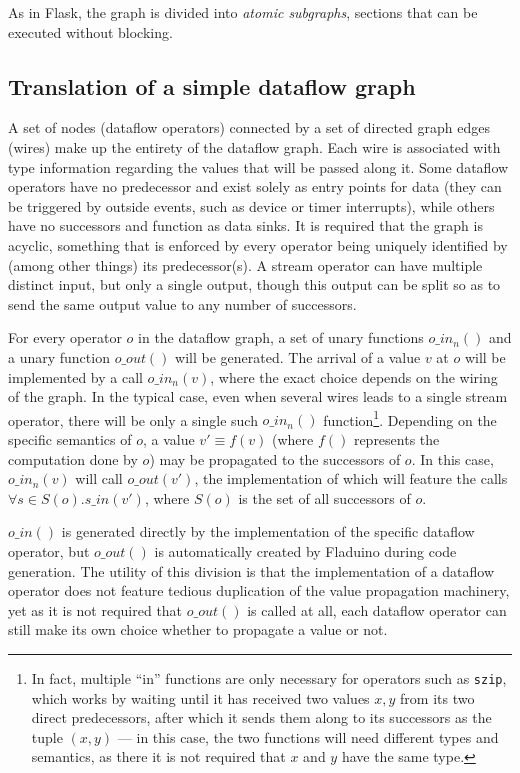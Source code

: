\documentclass[a4paper, oneside, final]{memoir}
\begin{document}
As in Flask, the graph is divided into \textit{atomic subgraphs},
sections that can be executed without blocking.

\subsection{Translation of a simple dataflow graph}

A set of nodes (dataflow operators) connected by a set of directed
graph edges (wires) make up the entirety of the dataflow graph. Each
wire is associated with type information regarding the values that
will be passed along it.  Some dataflow operators have no predecessor
and exist solely as entry points for data (they can be triggered by
outside events, such as device or timer interrupts), while others have
no successors and function as data sinks.  It is required that the
graph is acyclic, something that is enforced by every operator being
uniquely identified by (among other things) its predecessor(s).  A
stream operator can have multiple distinct input, but only a single
output, though this output can be split so as to send the same output
value to any number of successors.

For every operator $o$ in the dataflow graph, a set of unary functions
$o\_in_n()$ and a unary function $o\_out()$ will be generated.  The
arrival of a value $v$ at $o$ will be implemented by a call
$o\_in_n(v)$, where the exact choice depends on the wiring of the
graph.  In the typical case, even when several wires leads to a single
stream operator, there will be only a single such $o\_in_n()$
function\footnote{In fact, multiple ``in'' functions are only
  necessary for operators such as \texttt{szip}, which works by
  waiting until it has received two values $x, y$ from its two direct
  predecessors, after which it sends them along to its successors as
  the tuple $(x,y)$ --- in this case, the two functions will need
  different types and semantics, as there it is not required that $x$
  and $y$ have the same type.}.  Depending on the specific semantics
of $o$, a value $v'\equiv f(v)$ (where $f()$ represents the
computation done by $o$) may be propagated to the successors of $o$.
In this case, $o\_in_n(v)$ will call $o\_out(v')$, the implementation
of which will feature the calls $\forall s \in S(o). s\_in(v')$, where
$S(o)$ is the set of all successors of $o$.

$o\_in()$ is generated directly by the implementation of the specific
dataflow operator, but $o\_out()$ is automatically created by Fladuino
during code generation.  The utility of this division is that the
implementation of a dataflow operator does not feature tedious
duplication of the value propagation machinery, yet as it is not
required that $o\_out()$ is called at all, each dataflow operator can
still make its own choice whether to propagate a value or not.
\end{document}
